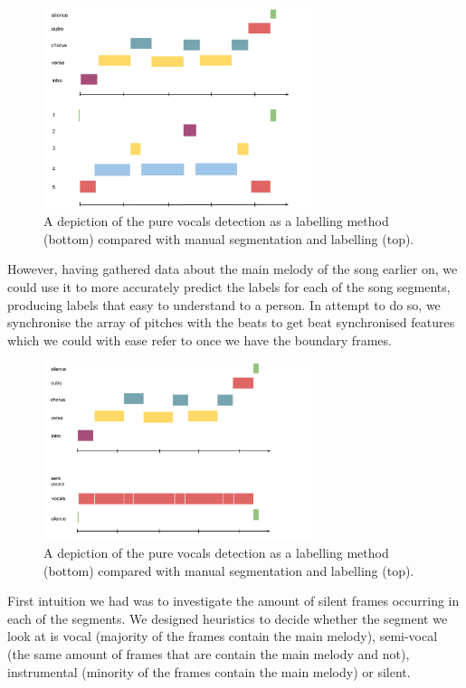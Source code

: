 \begin{figure}[h]
	\centering
   \includegraphics[width=0.7\textwidth]{Figures/NumericalLabels}
\caption{A depiction of the pure vocals detection as a labelling method (bottom) compared with manual segmentation and labelling (top).}
\label{fig:numericsimple}
\end{figure}

However, having gathered data about the main melody of the song earlier on, we could use it to more accurately predict the labels for each of the song segments, producing labels that easy to understand to a person. In attempt to do so, we synchronise the array of pitches with the beats to get beat synchronised features which we could with ease refer to once we have the boundary frames. 

\begin{figure}[h]
	\centering
   \includegraphics[width=0.7\textwidth]{Figures/BeatlesSegmentation}
\caption{A depiction of the pure vocals detection as a labelling method (bottom) compared with manual segmentation and labelling (top).}
\label{fig:vocalsimple}
\end{figure}

First intuition we had was to investigate the amount of silent frames occurring in each of the segments. We designed heuristics to decide whether the segment we look at is vocal (majority of the frames contain the main melody), semi-vocal (the same amount of frames that are contain the main melody and not), instrumental (minority of the frames contain the main melody) or silent. 

